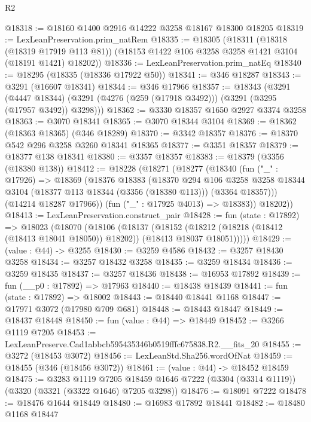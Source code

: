 \begin{lexlean}{R2}
\begin{coremodule}
@18318 := @18160 @1400 @2916 @14222 @3258 @18167 @18300 @18205
@18319 := LexLeanPreservation.prim_natRem
@18335 := @18305
    (@18311
      (@18318 (@18319 @17919 @113 @81))
      (@18153 @1422 @106 @3258 @3258 @1421 @3104 (@18191 @1421) @18202))
@18336 := LexLeanPreservation.prim_natEq
@18340 := @18295 (@18335 (@18336 @17922 @50))
@18341 := @346 @18287
@18343 := @3291 (@16607 @18341)
@18344 := @346 @17966
@18357 := @18343
    (@3291
      (@4447 @18344)
      (@3291 (@4276 (@259 (@17918 @3492))) (@3291 (@3295 (@17957 @3492)) @3298)))
@18362 := @3330 @18357 @1650 @2927 @3374 @3258
@18363 := @3070 @18341
@18365 := @3070 @18344 @3104
@18369 := @18362 (@18363 @18365) (@346 @18289)
@18370 := @3342 @18357
@18376 := @18370 @542 @296 @3258 @3260 @18341 @18365
@18377 := @3351 @18357
@18379 := @18377 @138 @18341
@18380 := @3357 @18357
@18383 := @18379 (@3356 (@18380 @138))
@18412 := @18228
    (@18271
      (@18277
        (@18340
          (fun ("_" : @17926) =>
          @18369
            (@18376
              @18383
              (@18370
                @294
                @106
                @3258
                @3258
                @18344
                @3104
                (@18377 @113 @18344 (@3356 (@18380 @113)))
                (@3364 @18357)))
            (@14214 @18287 @17966))
          (fun ("_" : @17925 @4013) => @18383))
        @18202))
@18413 := LexLeanPreservation.construct_pair
@18428 := fun (state : @17892) =>
  @18023
    (@18070
      (@18106
        (@18137
          (@18152
            (@18212 (@18218 (@18412 (@18413 @18041 @18050)) @18202))
            (@18413 @18037 @18051)))))
@18429 := (value : @44) -> @3255
@18430 := @3259 @4586
@18432 := @3257 @18430 @3258
@18434 := @3257 @18432 @3258
@18435 := @3259 @18434
@18436 := @3259 @18435
@18437 := @3257 @18436
@18438 := @16953 @17892
@18439 := fun (__p0 : @17892) => @17963
@18440 := @18438 @18439
@18441 := fun (state : @17892) => @18002
@18443 := @18440 @18441 @1168
@18447 := @17971 @3072 (@17980 @709 @681)
@18448 := @18443 @18447
@18449 := @18437 @18448
@18450 := fun (value : @44) => @18449
@18452 := @3266 @1119 @7205
@18453 := LexLeanPreserve.Cad1abbcb595435346b0519fffc675838.R2.__fits_20
@18455 := @3272 (@18453 @3072)
@18456 := LexLeanStd.Sha256.wordOfNat
@18459 := @18455 (@346 (@18456 @3072))
@18461 := (value : @44) -> @18452 @18459
@18475 := @3283
    @1119
    @7205
    @18459
    @1646
    @7222
    (@3304 (@3314 @1119))
    (@3320 (@3321 (@3322 @1646) @7205 @3298))
@18476 := @18091 @7222
@18478 := @18476 @1644 @18449
@18480 := @16983 @17892 @18441
@18482 := @18480 @1168 @18447

\end{coremodule}
\end{lexlean}
